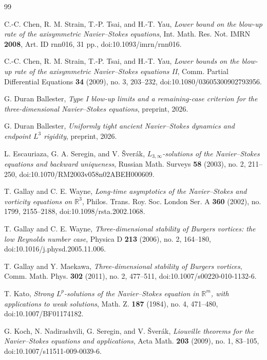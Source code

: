 \documentclass[11pt]{amsart}
\theoremstyle{plain}
\theoremstyle{definition}
\theoremstyle{remark}
\numberwithin{equation}{section}
\begin{document}
\begin{thebibliography}{99}

C.-C. Chen, R. M. Strain, T.-P. Tsai, and H.-T. Yau,
\emph{Lower bound on the blow-up rate of the axisymmetric Navier--Stokes
equations},
Int. Math. Res. Not. IMRN \textbf{2008}, Art. ID rnn016, 31 pp.,
doi:10.1093/imrn/rnn016.

C.-C. Chen, R. M. Strain, T.-P. Tsai, and H.-T. Yau,
\emph{Lower bounds on the blow-up rate of the axisymmetric Navier--Stokes
equations II},
Comm. Partial Differential Equations \textbf{34} (2009), no. 3, 203--232,
doi:10.1080/03605300902793956.

G. Duran Ballester,
\emph{Type I blow-up limits and a remaining-case criterion for the
three-dimensional Navier--Stokes equations}, preprint, 2026.

G. Duran Ballester,
\emph{Uniformly tight ancient Navier--Stokes dynamics and endpoint \(L^3\)
rigidity}, preprint, 2026.

L. Escauriaza, G. A. Seregin, and V. \v{S}ver\'ak,
\emph{\(L_{3,\infty}\)-solutions of the Navier--Stokes equations and backward
uniqueness},
Russian Math. Surveys \textbf{58} (2003), no. 2, 211--250,
doi:10.1070/RM2003v058n02ABEH000609.

T. Gallay and C. E. Wayne,
\emph{Long-time asymptotics of the Navier--Stokes and vorticity equations on
\(\mathbb R^3\)},
Philos. Trans. Roy. Soc. London Ser. A \textbf{360} (2002), no. 1799,
2155--2188, doi:10.1098/rsta.2002.1068.

T. Gallay and C. E. Wayne,
\emph{Three-dimensional stability of Burgers vortices: the low Reynolds number
case},
Physica D \textbf{213} (2006), no. 2, 164--180,
doi:10.1016/j.physd.2005.11.006.

T. Gallay and Y. Maekawa,
\emph{Three-dimensional stability of Burgers vortices},
Comm. Math. Phys. \textbf{302} (2011), no. 2, 477--511,
doi:10.1007/s00220-010-1132-6.

T. Kato,
\emph{Strong \(L^p\)-solutions of the Navier--Stokes equation in
\(\mathbb R^m\), with applications to weak solutions},
Math. Z. \textbf{187} (1984), no. 4, 471--480,
doi:10.1007/BF01174182.

G. Koch, N. Nadirashvili, G. Seregin, and V. \v{S}ver\'ak,
\emph{Liouville theorems for the Navier--Stokes equations and applications},
Acta Math. \textbf{203} (2009), no. 1, 83--105,
doi:10.1007/s11511-009-0039-6.


\end{thebibliography}
\end{document}
